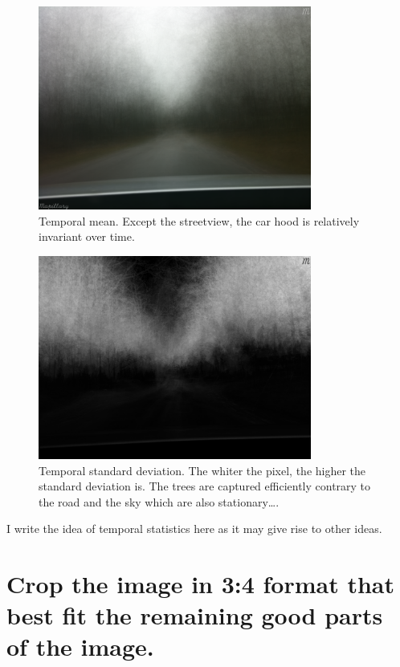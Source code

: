 \documentclass[a4paper,twoside,10pt]{article}
\begin{document}
\begin{figure}
	\centering
  \includegraphics[width=0.8\textwidth]{mean_image.png}
	\caption{Temporal mean. Except the streetview, the car hood is relatively invariant over time.}
	\label{fig:mean_image}
\end{figure}

\begin{figure}
  \centering
  \includegraphics[width=0.8\textwidth]{std_dev_image.png}
	\caption{Temporal standard deviation. The whiter the pixel, the higher the standard deviation is. The trees are captured efficiently contrary to the road and the sky which are also stationary\dots.}
	\label{fig:std_dev_image}
\end{figure}

I write the idea of temporal statistics here as it may give rise to other ideas.


\section{Crop the image in 3:4 format that best fit the remaining good parts of the image.}
\end{document}
